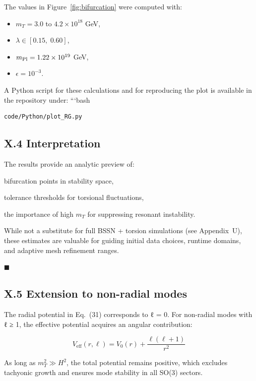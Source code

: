 \documentclass{article}
\begin{document}
The values in Figure~\ref{fig:bifurcation} were computed with:
\begin{itemize}
  \item $m_T = 3.0$ to $4.2 \times 10^{18}$ GeV,
  \item $\lambda \in [0.15,\;0.60]$,
  \item $m_{\rm Pl} = 1.22 \times 10^{19}$ GeV,
  \item $\epsilon = 10^{-3}$.
\end{itemize}

A Python script for these calculations and for reproducing the plot is available in the repository under:
```bash

\begin{verbatim}
code/Python/plot_RG.py
\end{verbatim}

\subsection*{X.4 Interpretation}

The results provide an analytic preview of:

    bifurcation points in stability space,

    tolerance thresholds for torsional fluctuations,

    the importance of high $m_T$ for suppressing resonant instability.

While not a substitute for full BSSN + torsion simulations (see Appendix~U), these estimates are valuable for guiding initial data choices, runtime domains, and adaptive mesh refinement ranges.

\hfill$\blacksquare$

\subsection*{X.5 Extension to non-radial modes}

The radial potential in Eq.~(31) corresponds to ℓ = 0.  
For non-radial modes with ℓ ≥ 1, the effective potential acquires an angular contribution:

\begin{equation}
V_{\text{eff}}(r, \ell) = V_0(r) + \frac{\ell(\ell+1)}{r^2}
\end{equation}

As long as \( m_T^2 \gg H^2 \), the total potential remains positive,  
which excludes tachyonic growth and ensures mode stability in all SO(3) sectors.
\end{document}
